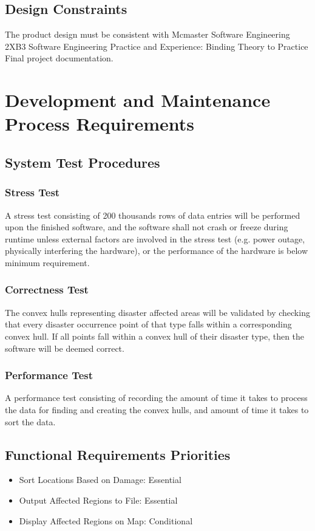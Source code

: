 \documentclass{article}
\begin{document}
    \subsection{Design Constraints}
    The product design must be consistent with Mcmaster Software Engineering 
    2XB3 Software Engineering Practice and Experience: Binding Theory to Practice 
    Final project documentation.
    
    \section{Development and Maintenance Process Requirements}
    \subsection{System Test Procedures}
    \subsubsection{Stress Test}
    A stress test consisting of 200 thousands rows of data entries will be 
    performed upon the finished software, and the software shall not crash 
    or freeze during runtime unless external factors are involved in the 
    stress test (e.g. power outage, physically interfering the hardware),
    or the performance of the hardware is below minimum requirement.

    \subsubsection{Correctness Test}
    The convex hulls representing disaster affected areas will be validated 
    by checking that every disaster occurrence point of that type falls within a 
    corresponding convex hull. If all points fall within a convex hull of their 
    disaster type, then the software will be deemed correct.

    \subsubsection {Performance Test}
    A performance test consisting of recording the amount of time it takes to 
    process the data for finding and creating the convex hulls, and amount of 
    time it takes to sort the data.
        \subsection{Functional Requirements Priorities}
            \begin{itemize}
                \item Sort Locations Based on Damage: Essential
                \item Output Affected Regions to File: Essential
                \item Display Affected Regions on Map: Conditional
            \end{itemize}
\end{document}
